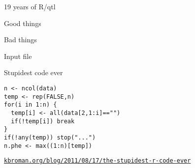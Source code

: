 \documentclass[12pt,t,aspectratio=169]{beamer}
\begin{document}
\begin{frame}[c]{19 years of R/qtl}


\end{frame}




\begin{frame}[c]{}

\centerline{\Large Good things}

\vspace{4mm}


\end{frame}


\begin{frame}{}

\vspace*{16.7mm}

\centerline{\Large Bad things}

\end{frame}


\begin{frame}[c]{Input file}


\end{frame}


\begin{frame}[c,fragile]{Stupidest code ever}

\begin{center}
\begin{minipage}[c]{9.3cm}
\begin{semiverbatim}
\lstset{basicstyle=\normalsize}
\begin{lstlisting}[linewidth=9.3cm]
n <- ncol(data)
temp <- rep(FALSE,n)
for(i in 1:n) {
  temp[i] <- all(data[2,1:i]=="")
  if(!temp[i]) break
}
if(!any(temp)) stop("...")
n.phe <- max((1:n)[temp])
\end{lstlisting}
\end{semiverbatim}
\end{minipage}
\end{center}

\vspace{3mm}

\hfill \href{https://kbroman.org/blog/2011/08/17/the-stupidest-r-code-ever}{\scriptsize \lolit \tt kbroman.org/blog/2011/08/17/the-stupidest-r-code-ever}

\end{frame}
\end{document}
